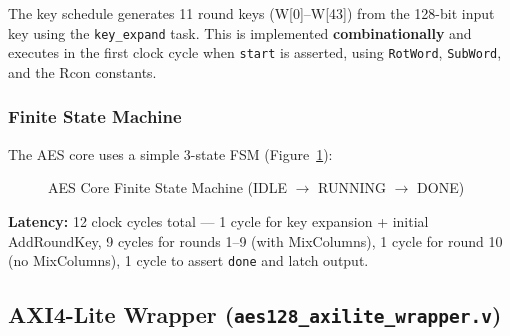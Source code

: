 The key schedule generates 11 round keys (W[0]--W[43]) from the 128-bit input key using the \texttt{key\_expand} task. This is implemented \textbf{combinationally} and executes in the first clock cycle when \texttt{start} is asserted, using \texttt{RotWord}, \texttt{SubWord}, and the Rcon constants.

\subsubsection{Finite State Machine}

The AES core uses a simple 3-state FSM (Figure~\ref{fig:fsm_tikz}):

\begin{figure}[H]
\centering
{}
\caption{AES Core Finite State Machine (IDLE $\to$ RUNNING $\to$ DONE)}
\label{fig:fsm_tikz}
\end{figure}

\textbf{Latency:} 12 clock cycles total --- 1 cycle for key expansion + initial AddRoundKey, 9 cycles for rounds 1--9 (with MixColumns), 1 cycle for round 10 (no MixColumns), 1 cycle to assert \texttt{done} and latch output.

\subsection{AXI4-Lite Wrapper (\texttt{aes128\_axilite\_wrapper.v})}

